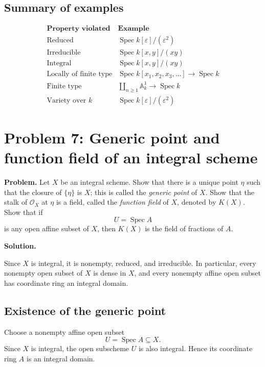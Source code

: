 \documentclass[12pt,a4paper]{article}
\DeclareMathOperator{\Spec}{Spec}
\newcommand{\OO}{\mathcal{O}}
\providecommand{\Spec}{\operatorname{Spec}}
\theoremstyle{notespace}
\begin{document}
\subsection*{Summary of examples}

\[
\begin{array}{c|c}
	\textbf{Property violated} & \textbf{Example} \\
	\hline
	\text{Reduced} &
	\Spec k[\varepsilon]/(\varepsilon^2)
	\\[4pt]
	\text{Irreducible} &
	\Spec k[x,y]/(xy)
	\\[4pt]
	\text{Integral} &
	\Spec k[x,y]/(xy)
	\\[4pt]
	\text{Locally of finite type} &
	\Spec k[x_1,x_2,x_3,\dots]\to \Spec k
	\\[4pt]
	\text{Finite type} &
	\displaystyle \coprod_{n\geq 1}\mathbb A_k^1\to \Spec k
	\\[8pt]
	\text{Variety over }k &
	\Spec k[\varepsilon]/(\varepsilon^2)
\end{array}
\]

\section{Problem 7: Generic point and function field of an integral scheme}

\textbf{Problem.}
Let \(X\) be an integral scheme. Show that there is a unique point \(\eta\) such that the closure of \(\{\eta\}\) is \(X\); this is called the \emph{generic point} of \(X\). Show that the stalk of \(\OO_X\) at \(\eta\) is a field, called the \emph{function field} of \(X\), denoted by \(K(X)\). Show that if
\[
U=\Spec A
\]
is any open affine subset of \(X\), then \(K(X)\) is the field of fractions of \(A\).

\bigskip

\textbf{Solution.}

Since \(X\) is integral, it is nonempty, reduced, and irreducible. In particular, every nonempty open subset of \(X\) is dense in \(X\), and every nonempty affine open subset has coordinate ring an integral domain.

\subsection*{Existence of the generic point}

Choose a nonempty affine open subset
\[
U=\Spec A\subseteq X.
\]
Since \(X\) is integral, the open subscheme \(U\) is also integral. Hence its coordinate ring \(A\) is an integral domain.
\end{document}
